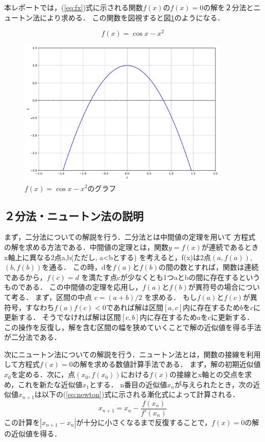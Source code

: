 \documentclass[uplatex]{jsarticle}
\begin{document}
本レポートでは，(\ref{eq:fx})式に示される関数$f(x)$の$f(x)=0$の解を２分法とニュートン法により求める．
この関数を図視すると図\ref{fig:func}のようになる．

\begin{equation}
f(x)=\cos x- x^2\label{eq:fx}
\end{equation}

\begin{figure}[H]
    \centering
    \includegraphics[width=0.9\textwidth]{class_technical_report-main_shiozawaChange/func_graph.pdf}
    \caption{$f(x)=\cos x- x^2$のグラフ}
    \label{fig:func}
\end{figure}


\subsection{２分法・ニュートン法の説明}

まず，二分法についての解説を行う．二分法とは中間値の定理を用いて
方程式の解を求める方法である．中間値の定理とは，関数$y=f(x)$が連続であるとき
x軸上に異なる2点a,b(ただし, a<bとする)
を考えると，f(x)は2点$(a,f(a))$, $(b,f(b))$を通る．
この時，dを$f(a)$と$f(b)$の間の数とすれば，関数は連続であるから，$f(c)=d$
を満たす点cが少なくとも1つaとbの間に存在するというものである．
この中間値の定理を応用し，$f(a)$と$f(b)$が異符号の場合について考る．
まず，区間の中点 $c = (a+b)/2$ を求める．
もし$f(a)$と$f(c)$が異符号，すなわち$f(a)f(c)<0$であれば解は区間$[a,c]$内に存在するため$b$を$c$に更新する．
そうでなければ解は区間$[c,b]$内に存在するため$a$を$c$に更新する．
この操作を反復し，解を含む区間の幅を狭めていくことで解の近似値を得る手法が二分法である．



次にニュートン法についての解説を行う．ニュートン法とは，関数の接線を利用して方程式$f(x)=0$の解を求める数値計算手法である．
まず，解の初期近似値$x_0$を定める．次に，点$(x_0, f(x_0))$における$f(x)$の接線とx軸との交点を求め，これを新たな近似値$x_1$とする．
n番目の近似値$x_n$が与えられたとき，次の近似値$x_{n+1}$は以下の(\ref{eq:newton})式に示される漸化式によって計算される．
\begin{equation}
x_{n+1} = x_n - \frac{f(x_n)}{f'(x_n)}\label{eq:newton}
\end{equation}
この計算を$|x_{n+1} - x_n|$が十分に小さくなるまで反復することで，$f(x)=0$の解の近似値を得る．
\end{document}
